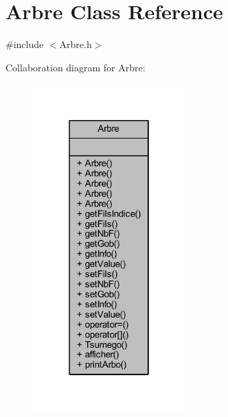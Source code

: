 \hypertarget{class_arbre}{}\section{Arbre Class Reference}
\label{class_arbre}


{\ttfamily \#include $<$Arbre.\+h$>$}



Collaboration diagram for Arbre\+:\nopagebreak
\begin{figure}[H]
\begin{center}
\leavevmode
\includegraphics[width=166pt]{class_arbre__coll__graph}
\end{center}
\end{figure}
